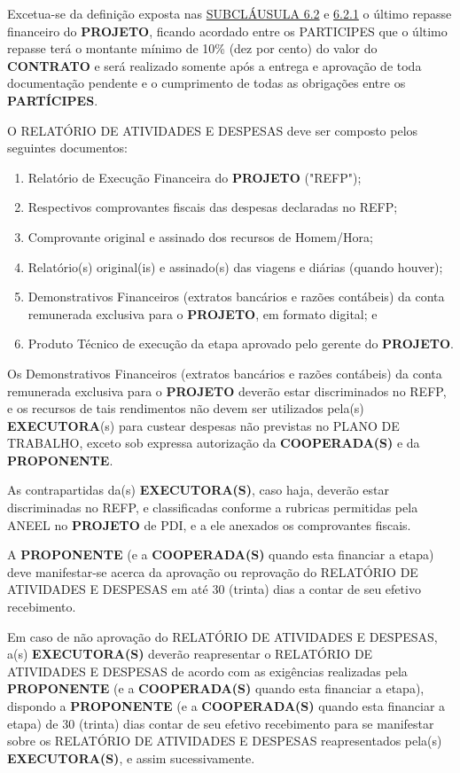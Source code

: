 \xxx Excetua-se da definição exposta nas \hyperlink{6.2}{SUBCLÁUSULA 6.2} e \hyperlink{6.2.1}{6.2.1} o último repasse financeiro do \textbf{PROJETO}, ficando acordado entre os PARTICIPES que o último repasse terá o montante mínimo de 10\% (dez por cento) do valor do \textbf{CONTRATO} e será realizado somente após a entrega e aprovação de toda documentação pendente e o cumprimento de todas as obrigações entre os \textbf{PARTÍCIPES}.

\xx O RELATÓRIO DE ATIVIDADES E DESPESAS deve ser composto pelos seguintes documentos:

\begin{enumerate}[label=\alph*), leftmargin=2cm]
    \item Relatório de Execução Financeira do \textbf{PROJETO} ("REFP");
    \item Respectivos comprovantes fiscais das despesas declaradas no REFP;
    \item Comprovante original e assinado dos recursos de Homem/Hora;
    \item Relatório(s) original(is) e assinado(s) das viagens e diárias (quando houver);
    \item Demonstrativos Financeiros (extratos bancários e razões contábeis) da conta remunerada exclusiva para o \textbf{PROJETO}, em formato digital; e
    \item Produto Técnico de execução da etapa aprovado pelo gerente do \textbf{PROJETO}.
\end{enumerate}

\xx Os Demonstrativos Financeiros (extratos bancários e razões contábeis) da conta remunerada exclusiva para o \textbf{PROJETO} deverão estar discriminados no REFP, e os recursos de tais rendimentos não devem ser utilizados pela(s) \textbf{EXECUTORA}(s) para custear despesas não previstas no PLANO DE TRABALHO, exceto sob expressa autorização da \textbf{COOPERADA(S)} e da \textbf{PROPONENTE}.

\xx As contrapartidas da(s) \textbf{EXECUTORA(S)}, caso haja, deverão estar discriminadas no REFP, e classificadas conforme a rubricas permitidas pela ANEEL no \textbf{PROJETO} de PDI, e a ele anexados os comprovantes fiscais.

\xx A \textbf{PROPONENTE} (e a \textbf{COOPERADA(S)} quando esta financiar a etapa) deve manifestar-se acerca da aprovação ou reprovação do RELATÓRIO DE ATIVIDADES E DESPESAS em até 30 (trinta) dias a contar de seu efetivo recebimento.

\xxx Em caso de não aprovação do RELATÓRIO DE ATIVIDADES E DESPESAS, a(s) \textbf{EXECUTORA(S)} deverão reapresentar o RELATÓRIO DE ATIVIDADES E DESPESAS de acordo com as exigências realizadas pela \textbf{PROPONENTE} (e a \textbf{COOPERADA(S)} quando esta financiar a etapa), dispondo a \textbf{PROPONENTE} (e a \textbf{COOPERADA(S)} quando esta financiar a etapa) de 30 (trinta) dias contar de seu efetivo recebimento para se manifestar sobre os RELATÓRIO DE ATIVIDADES E DESPESAS reapresentados pela(s) \textbf{EXECUTORA(S)}, e assim sucessivamente.

